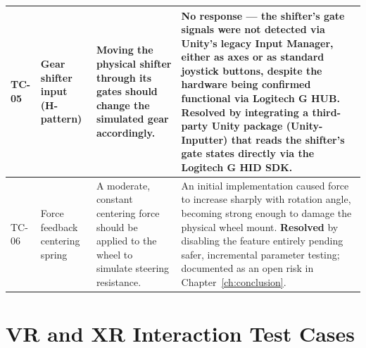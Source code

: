 {\begin{longtable}{|p{1.3cm}|p{3cm}|p{4.5cm}|p{4.5cm}|}
TC-05 & Gear shifter input (H-pattern) & Moving the physical shifter through its gates should change the simulated gear accordingly. & No response — the shifter's gate signals were not detected via Unity's legacy Input Manager, either as axes or as standard joystick buttons, despite the hardware being confirmed functional via Logitech G HUB. \textbf{Resolved} by integrating a third-party Unity package (Unity-Inputter) that reads the shifter's gate states directly via the Logitech G HID SDK. \\ \hline

TC-06 & Force feedback centering spring & A moderate, constant centering force should be applied to the wheel to simulate steering resistance. & An initial implementation caused force to increase sharply with rotation angle, becoming strong enough to damage the physical wheel mount. \textbf{Resolved} by disabling the feature entirely pending safer, incremental parameter testing; documented as an open risk in Chapter~\ref{ch:conclusion}. \\ \hline

\end{longtable}}

\section{VR and XR Interaction Test Cases}

